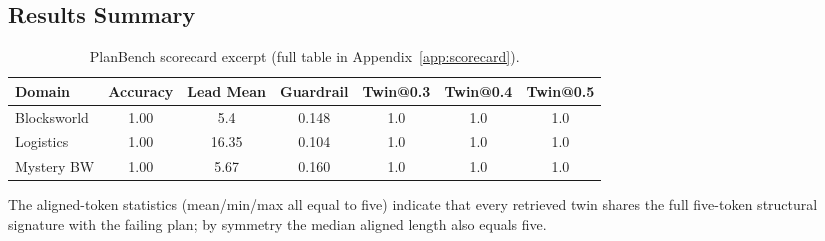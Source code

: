 \documentclass[11pt]{article}
\begin{document}
\subsection{Results Summary}
\begin{table}[h]
  \centering
  \caption{PlanBench scorecard excerpt (full table in Appendix~\ref{app:scorecard}).}
  \label{tab:planbench-scorecard}
  \begin{tabular}{lcccccc}
    \toprule
    Domain & Accuracy & Lead Mean & Guardrail & Twin@0.3 & Twin@0.4 & Twin@0.5 \\
    \midrule
    Blocksworld & 1.00 & 5.4 & 0.148 & 1.0 & 1.0 & 1.0 \\
    Logistics & 1.00 & 16.35 & 0.104 & 1.0 & 1.0 & 1.0 \\
    Mystery BW & 1.00 & 5.67 & 0.160 & 1.0 & 1.0 & 1.0 \\
    \bottomrule
  \end{tabular}
\end{table}
The aligned-token statistics (mean/min/max all equal to five) indicate that every retrieved twin shares the full five-token structural signature with the failing plan; by symmetry the median aligned length also equals five.
\end{document}
